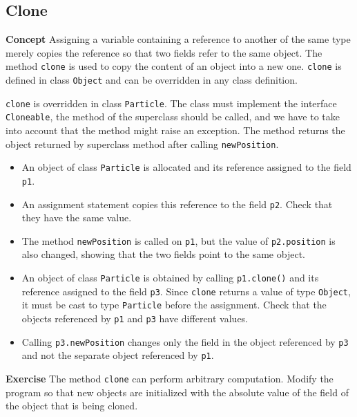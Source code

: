 \subsection{Clone}\label{inher.08}

\textbf{Concept} Assigning a variable containing a reference to another
of the same type merely copies the 
reference so that two fields refer to the same object. The method 
\texttt{clone} is used to copy the content of an object into a new one. 
\texttt{clone} is defined in class \texttt{Object} and can be
overridden in any class definition.


\texttt{clone} is overridden in class \texttt{Particle}. 
The class must implement the interface \texttt{Cloneable}, the 
method of the superclass should be called, and we have to take into 
account that the method might raise an exception. The method returns
the object returned by superclass method after calling \texttt{newPosition}.
\begin{itemize}
\item An object of class \texttt{Particle} is allocated and its reference 
assigned to the field \texttt{p1}. 
\item An assignment statement copies this reference to the field \texttt{p2}. 
Check that they have the same value.
\item The method \texttt{newPosition} is called on \texttt{p1}, but the 
value of \texttt{p2.position} is also changed, showing that the two fields 
point to the same object.
\item An object of class \texttt{Particle} is obtained by calling \texttt{p1.clone()} and its reference assigned to the field \texttt{p3}. Since \texttt{clone} returns a value of type
\texttt{Object}, it must be cast to type \texttt{Particle} before the assignment.
Check that the objects referenced by \texttt{p1} and \texttt{p3} have different values.
\item Calling \texttt{p3.newPosition} changes only the field in the object
referenced by \texttt{p3} and not the separate object referenced by \texttt{p1}.
\end{itemize}

\textbf{Exercise} The method \texttt{clone} can perform arbitrary 
computation. Modify the program so that new objects are initialized with 
the absolute value of the field of the object that is being cloned.
